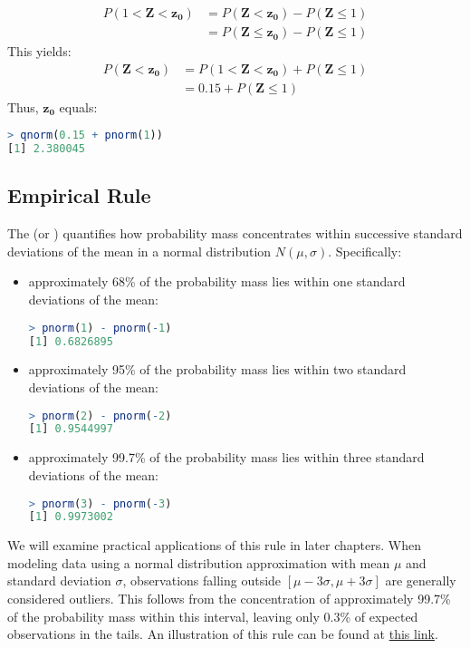 \begin{solution}
\begin{enumerate}
\begin{align*}
        P(1 < \bm{Z} < \bm{z_0}) &= P(\bm{Z} < \bm{z_0}) - P(\bm{Z} \leq 1)\\
        &= P(\bm{Z} \leq \bm{z_0}) - P(\bm{Z} \leq 1)
    \end{align*}
    This yields:
    \begin{align*}
        P(\bm{Z} < \bm{z_0}) &= P(1 < \bm{Z} < \bm{z_0}) + P(\bm{Z} \leq 1)\\
        &= 0.15 + P(\bm{Z} \leq 1)
    \end{align*}
    Thus, \( \bm{z_0} \) equals:
    \begin{lstlisting}[language=R]
> qnorm(0.15 + pnorm(1))
[1] 2.380045
    \end{lstlisting}
    \end{enumerate}
\end{solution}

\subsection{Empirical Rule}

The  (or ) quantifies how probability mass concentrates within successive standard deviations of the mean in a normal distribution \( N(\mu, \sigma) \).
Specifically:
\begin{itemize}
    \item approximately 68\% of the probability mass lies within one standard deviations of the mean:
    \begin{lstlisting}[language=R]
> pnorm(1) - pnorm(-1)
[1] 0.6826895      
    \end{lstlisting}
    \item approximately 95\% of the probability mass lies within two standard deviations of the mean:
    \begin{lstlisting}[language=R]
> pnorm(2) - pnorm(-2)
[1] 0.9544997
    \end{lstlisting}
    \item approximately 99.7\% of the probability mass lies within three standard deviations of the mean:
    \begin{lstlisting}[language=R]
> pnorm(3) - pnorm(-3)
[1] 0.9973002
    \end{lstlisting}
\end{itemize}
We will examine practical applications of this rule in later chapters.
When modeling data using a normal distribution approximation with mean \( \mu \) and standard deviation \( \sigma \),
observations falling outside \( [\mu - 3\sigma, \mu + 3\sigma] \) are generally considered outliers.
This follows from the concentration of approximately 99.7\% of the probability mass within this interval,
leaving only 0.3\% of expected observations in the tails.
An illustration of this rule can be found at \href{https://andymath.com/normal-distribution-empirical-rule/}{this link}.

